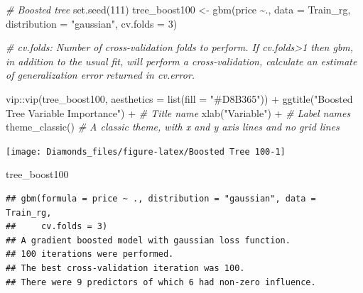 \documentclass[
]{article}
\newenvironment{Shaded}{\begin{snugshade}}{\end{snugshade}}
\newcommand{\AttributeTok}[1]{\textcolor[rgb]{0.77,0.63,0.00}{#1}}
\newcommand{\CommentTok}[1]{\textcolor[rgb]{0.56,0.35,0.01}{\textit{#1}}}
\newcommand{\ConstantTok}[1]{\textcolor[rgb]{0.00,0.00,0.00}{#1}}
\newcommand{\DecValTok}[1]{\textcolor[rgb]{0.00,0.00,0.81}{#1}}
\newcommand{\FunctionTok}[1]{\textcolor[rgb]{0.00,0.00,0.00}{#1}}
\newcommand{\NormalTok}[1]{#1}
\newcommand{\OtherTok}[1]{\textcolor[rgb]{0.56,0.35,0.01}{#1}}
\newcommand{\SpecialCharTok}[1]{\textcolor[rgb]{0.00,0.00,0.00}{#1}}
\newcommand{\StringTok}[1]{\textcolor[rgb]{0.31,0.60,0.02}{#1}}
\begin{document}
\begin{Shaded}
\begin{Highlighting}[]
\CommentTok{\# Boosted tree}
\FunctionTok{set.seed}\NormalTok{(}\DecValTok{111}\NormalTok{)}
\NormalTok{tree\_boost100 }\OtherTok{\textless{}{-}} \FunctionTok{gbm}\NormalTok{(price }\SpecialCharTok{\textasciitilde{}}\NormalTok{., }\AttributeTok{data =}\NormalTok{ Train\_rg, }\AttributeTok{distribution =} \StringTok{"gaussian"}\NormalTok{, }\AttributeTok{cv.folds =} \DecValTok{3}\NormalTok{)}

\CommentTok{\# cv.folds: Number of cross{-}validation folds to perform. If cv.folds\textgreater{}1 then gbm, in addition to the usual fit, will perform a cross{-}validation, calculate an estimate of generalization error returned in cv.error.}

\NormalTok{vip}\SpecialCharTok{::}\FunctionTok{vip}\NormalTok{(tree\_boost100, }\AttributeTok{aesthetics =} \FunctionTok{list}\NormalTok{(}\AttributeTok{fill =} \StringTok{"\#D8B365"}\NormalTok{)) }\SpecialCharTok{+}
  \FunctionTok{ggtitle}\NormalTok{(}\StringTok{"Boosted Tree Variable Importance"}\NormalTok{) }\SpecialCharTok{+} \CommentTok{\# Title name}
  \FunctionTok{xlab}\NormalTok{(}\StringTok{"Variable"}\NormalTok{) }\SpecialCharTok{+} \CommentTok{\# Label names}
  \FunctionTok{theme\_classic}\NormalTok{() }\CommentTok{\# A classic theme, with x and y axis lines and no grid lines}
\end{Highlighting}
\end{Shaded}

\begin{center}\texttt{[image: Diamonds\_files/figure-latex/Boosted Tree 100-1]} \end{center}

\begin{Shaded}
\begin{Highlighting}[]
\NormalTok{tree\_boost100}
\end{Highlighting}
\end{Shaded}

\begin{verbatim}
## gbm(formula = price ~ ., distribution = "gaussian", data = Train_rg, 
##     cv.folds = 3)
## A gradient boosted model with gaussian loss function.
## 100 iterations were performed.
## The best cross-validation iteration was 100.
## There were 9 predictors of which 6 had non-zero influence.
\end{verbatim}

\begin{Shaded}
\end{Shaded}
\end{document}
